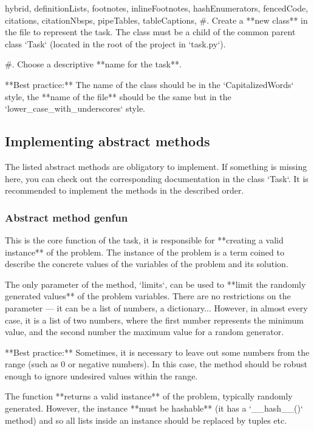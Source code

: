 \documentclass[
  digital, %
  table,   %
  twoside, %
  nolof,     %
  nolot,     %
  draft=false,
  final,
]{fithesis3}
\begin{document}
\begin{markdown*}{%
  hybrid,
  definitionLists,
  footnotes,
  inlineFootnotes,
  hashEnumerators,
  fencedCode,
  citations,
  citationNbsps,
  pipeTables,
  tableCaptions,
}
#. Create a **new class** in the file to represent the task. The class must be a child of
the common parent class `Task` (located in the root of the project in `task.py`).

#. Choose a descriptive **name for the task**.
\begin{shaded}{**Best practice:**}
    The name of the class should be in the `CapitalizedWords` style, the **name of the file** should be the same but in the `lower_case_with_underscores` style.
\end{shaded}

\subsection{Implementing abstract methods}

The listed abstract methods are obligatory to implement. If something is missing here,
you can check out the corresponding documentation in the class `Task`. 
It is recommended to implement the methods in the described order.

\subsubsection{Abstract method genfun} 

This is the core function of the task, it is responsible for **creating a valid
instance** of the problem. The instance of the problem is a term coined to describe
the concrete values of the variables of the problem and its solution.

The only parameter of the method, `limits`, can be used to **limit the randomly
generated values** of the problem variables. There are no restrictions on the
parameter --- it can be a list of numbers, a dictionary... However, in almost 
every case, it is a list of two numbers, where the first number represents the 
minimum value, and the second number the maximum value for a random generator.

\begin{shaded}{**Best practice:**}
    Sometimes, it is necessary to leave out some numbers from the range (such as 0 or negative numbers).
In this case, the method should be robust enough to ignore undesired values within the range.
\end{shaded}

The function **returns a valid instance** of the problem, typically randomly generated.
However, the instance **must be hashable** (it has a `__hash__()` method) and so all lists inside an instance should be replaced by tuples etc.



\end{markdown*}
\end{document}
